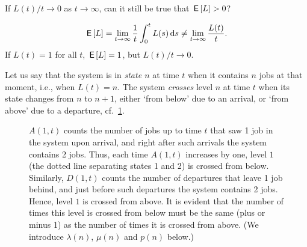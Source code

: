 \begin{extra}
  If $L(t)/t \to 0$ as $t\to\infty$, can it still be true that $\,\mathsf{E}\left[L\right]>0$? 
\begin{solution}
    \begin{equation*}
      \,\mathsf{E}\left[L\right] = \lim_{t\to\infty} \frac 1 t \int_0^t L(s) \,\text{d}s \neq \lim_{t\to\infty} \frac{L(t)}t.
    \end{equation*}
If $L(t)=1$ for all $t$, $\,\mathsf{E}\left[L\right] =1 $, but $L(t)/t \to 0$. 
\end{solution}
\end{extra}

Let us say that the system is in \emph{state $n$} at time $t$ when it contains $n$ jobs at that moment, i.e., when $L(t) = n$.
The system \emph{crosses} level $n$ at time $t$ when its state changes from $n$ to $n+1$, either `from below' due to an arrival, or `from above' due to a departure, cf.~\cref{fig:A_n_t}.

\begin{figure}[th]
  \centering
{}
\caption{ $A(1,t)$ counts the number of jobs up to time $t$ that saw 1
  job in the system upon arrival, and right after such arrivals the
  system contains 2 jobs.  Thus, each time $A(1,t)$ increases by
  one, level $1$ (the dotted line  separating states 1 and 2) is crossed from below.  Similarly, $D(1,t)$ counts the number of
  departures that leave 1 job behind, and just before such departures the system contains 2 jobs. Hence, level $1$ is crossed from above. 
It is evident that the number of times this
  level is crossed from below must be the same (plus or minus 1) as the
  number of times it is crossed from above. (We introduce $\lambda(n)$, $\mu(n)$ and $p(n)$ below.) }
\label{fig:A_n_t}
\end{figure}



